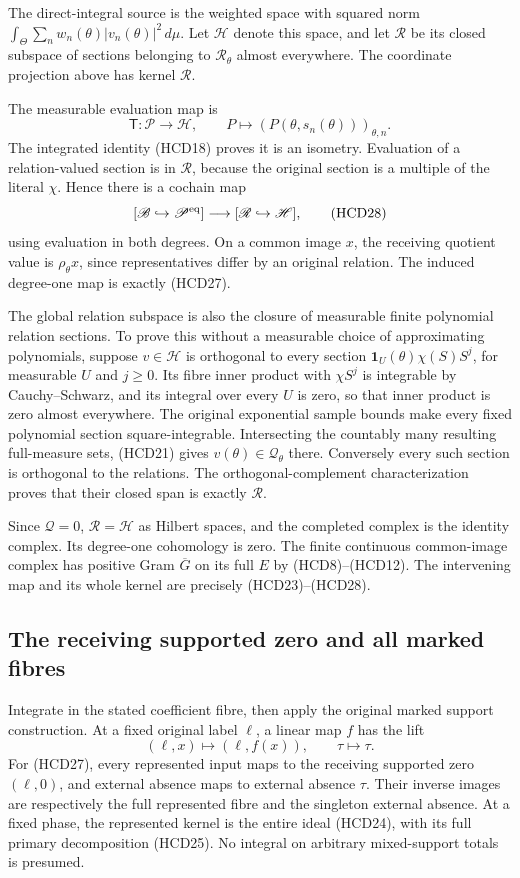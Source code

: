 \documentclass[11pt,a4paper]{article}
\theoremstyle{definition}
\begin{document}
The direct-integral source is the weighted space with squared
norm $\int_\Theta\sum_n w_n(\theta)|v_n(\theta)|^2\,d\mu$.
Let $\mathscr H$ denote this space, and let $\mathscr R$
be its closed subspace of sections belonging to
$\mathcal R_\theta$ almost everywhere. The coordinate
projection above has kernel $\mathscr R$.

The measurable evaluation map is
\[
 \mathsf T:\mathscr P\longrightarrow\mathscr H,\qquad
 P\longmapsto(P(\theta,s_n(\theta)))_{\theta,n}.
\]
The integrated identity (HCD18) proves it is an isometry.
Evaluation of a relation-valued section is in $\mathscr R$,
because the original section is a multiple of the literal
$\chi$. Hence there is a cochain map
\[
 [\mathscr B\hookrightarrow\mathscr P^{\rm eq}]
 \longrightarrow[\mathscr R\hookrightarrow\mathscr H],
 \tag{HCD28}
\]
using evaluation in both degrees. On a common image $x$,
the receiving quotient value is $\rho_\theta x$, since
representatives differ by an original relation.
The induced degree-one map is exactly (HCD27).

The global relation subspace is also the closure of measurable
finite polynomial relation sections. To prove this without
a measurable choice of approximating polynomials, suppose
$v\in\mathscr H$ is orthogonal to every section
$\mathbf1_U(\theta)\chi(S)S^j$, for measurable $U$ and $j\ge0$.
Its fibre inner product with $\chi S^j$ is integrable by
Cauchy--Schwarz, and its integral over every $U$ is zero,
so that inner product is zero almost everywhere.
The original exponential sample bounds make every fixed
polynomial section square-integrable.
Intersecting the countably many resulting full-measure sets,
(HCD21) gives $v(\theta)\in\mathcal Q_\theta$ there.
Conversely every such section is orthogonal to the relations.
The orthogonal-complement characterization proves that their
closed span is exactly $\mathscr R$.

Since $\mathscr Q=0$, $\mathscr R=\mathscr H$ as Hilbert
spaces, and the completed complex is the identity complex.
Its degree-one cohomology is zero. The finite continuous
common-image complex has positive Gram $\overline G$
on its full $E$ by (HCD8)--(HCD12).
The intervening map and its whole kernel are precisely
(HCD23)--(HCD28).

\subsection{The receiving supported zero and all marked fibres}

Integrate in the stated coefficient fibre, then apply the
original marked support construction. At a fixed original
label $\ell$, a linear map $f$ has the lift
\[
 (\ell,x)\longmapsto(\ell,f(x)),\qquad
 \tau\longmapsto\tau.
 \tag{HCD29}
\]
For (HCD27), every represented input maps to the receiving
supported zero $(\ell,0)$, and external absence maps to
external absence $\tau$. Their inverse images are respectively
the full represented fibre and the singleton external absence.
At a fixed phase, the represented kernel is the entire
ideal (HCD24), with its full primary decomposition (HCD25).
No integral on arbitrary mixed-support totals is presumed.
\end{document}
